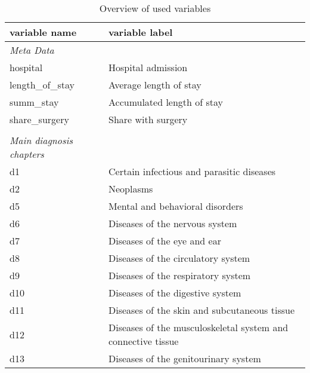 \begin{table}[H]
 \centering \caption{Overview of used variables}
\begin{tabular}{ll}
\toprule
\textbf{variable name} & \textbf{variable label}  \\
\midrule
\emph{Meta Data}\\
	\hspace{4pt} hospital  &       Hospital admission \\
	\hspace{4pt} length\_of\_stay  &       Average length of stay \\
	\hspace{4pt} summ\_stay  &       Accumulated length of stay \\
	\hspace{4pt} share\_surgery  &       Share with surgery \\
\\
\emph{Main diagnosis chapters} \\
	\hspace{4pt} d1  &       Certain infectious and parasitic diseases \\
	\hspace{4pt} d2  &       Neoplasms \\
	\hspace{4pt} d5  &       Mental and behavioral disorders \\
	\hspace{4pt} d6  &       Diseases of the nervous system \\
	\hspace{4pt} d7  &       Diseases of the eye and ear \\
	\hspace{4pt} d8  &       Diseases of the circulatory system \\
	\hspace{4pt} d9  &       Diseases of the respiratory system \\
	\hspace{4pt} d10  &       Diseases of the digestive system \\
	\hspace{4pt} d11  &       Diseases of the skin and subcutaneous tissue \\
	\hspace{4pt} d12  &       Diseases of the musculoskeletal system and connective tissue \\
	\hspace{4pt} d13  &       Diseases of the genitourinary system \\

\end{tabular}
\end{table}
